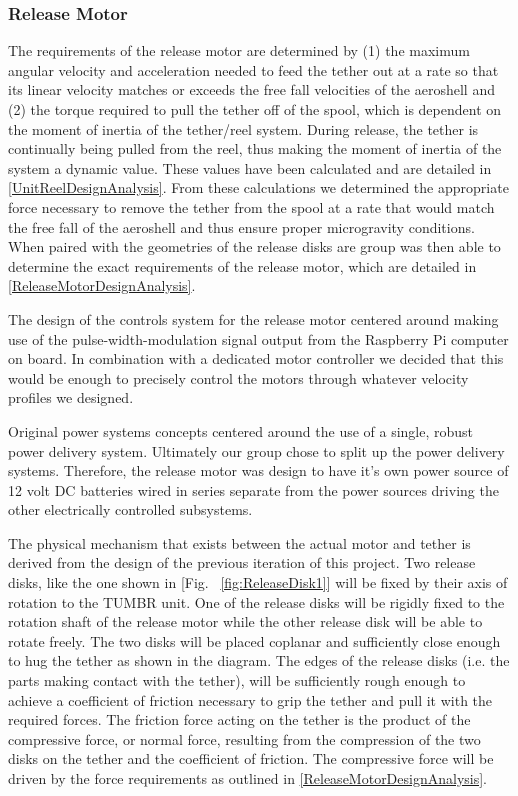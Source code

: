 \subsubsection{Release Motor}

\indent\indent The requirements of the release motor are determined by (1) the maximum angular velocity and acceleration needed to feed the tether out at a rate so that its linear velocity matches or exceeds the free fall velocities of the aeroshell and (2) the torque required to pull the tether off of the spool, which is dependent on the moment of inertia of the tether/reel system. During release, the tether is continually being pulled from the reel, thus making the moment of inertia of the system a dynamic value. These values have been calculated and are detailed in \ref{UnitReelDesignAnalysis}. From these calculations we determined the appropriate force necessary to remove the tether from the spool at a rate that would match the free fall of the aeroshell and thus ensure proper microgravity conditions. When paired with the geometries of the release disks are group was then able to determine the exact requirements of the release motor, which are detailed in \ref{ReleaseMotorDesignAnalysis}.

The design of the controls system for the release motor centered around making use of the pulse-width-modulation signal output from the Raspberry Pi computer on board. In combination with a dedicated motor controller we decided that this would be enough to precisely control the motors through whatever velocity profiles we designed. 

Original power systems concepts centered around the use of a single, robust power delivery system. Ultimately our group chose to split up the power delivery systems. Therefore, the release motor was design to have it's own power source of 12 volt DC batteries wired in series separate from the power sources driving the other electrically controlled subsystems. 

The physical mechanism that exists between the actual motor and tether is derived from the design of the previous iteration of this project. Two release disks, like the one shown in [Fig. ~\ref{fig:ReleaseDisk1}] will be fixed by their axis of rotation to the TUMBR unit. One of the release disks will be rigidly fixed to the rotation shaft of the release motor while the other release disk will be able to rotate freely. The two disks will be placed coplanar and sufficiently close enough to hug the tether as shown in the diagram. The edges of the release disks (i.e. the parts making contact with the tether), will be sufficiently rough enough to achieve a coefficient of friction necessary to grip the tether and pull it with the required forces. The friction force acting on the tether is the product of the compressive force, or normal force, resulting from the compression of the two disks on the tether and the coefficient of friction. The compressive force will be driven by the force requirements as outlined in \ref{ReleaseMotorDesignAnalysis}.

